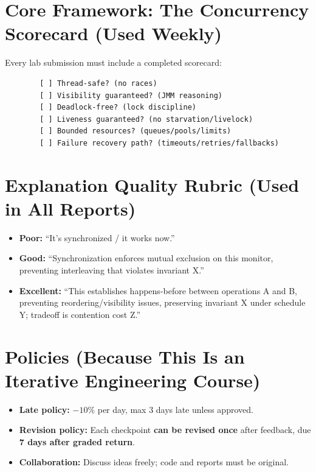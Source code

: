 \documentclass[11pt,a4paper]{article}
\begin{document}
	\section*{Core Framework: The Concurrency Scorecard (Used Weekly)}
	
	Every lab submission must include a completed scorecard:
	
	\begin{verbatim}
		[ ] Thread-safe? (no races)
		[ ] Visibility guaranteed? (JMM reasoning)
		[ ] Deadlock-free? (lock discipline)
		[ ] Liveness guaranteed? (no starvation/livelock)
		[ ] Bounded resources? (queues/pools/limits)
		[ ] Failure recovery path? (timeouts/retries/fallbacks)
	\end{verbatim}
	
	\section*{Explanation Quality Rubric (Used in All Reports)}
	
	\begin{itemize}[leftmargin=*]
		\item \textbf{Poor:} ``It's synchronized / it works now.''
		\item \textbf{Good:} ``Synchronization enforces mutual exclusion on this monitor, preventing interleaving that violates invariant X.''
		\item \textbf{Excellent:} ``This establishes happens-before between operations A and B, preventing reordering/visibility issues, preserving invariant X under schedule Y; tradeoff is contention cost Z.''
	\end{itemize}
	
	\section*{Policies (Because This Is an Iterative Engineering Course)}
	
	\begin{itemize}[leftmargin=*]
		\item \textbf{Late policy:} $-10\%$ per day, max 3 days late unless approved.
		\item \textbf{Revision policy:} Each checkpoint \textbf{can be revised once} after feedback, due \textbf{7 days after graded return}.
		\item \textbf{Collaboration:} Discuss ideas freely; code and reports must be original.
	\end{itemize}
	
\end{document}
